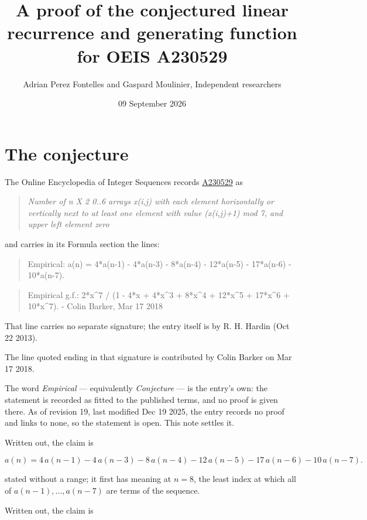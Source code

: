 \documentclass[11pt]{article}
\title{A proof of the conjectured linear recurrence and generating function for OEIS A230529}
\author{Adrian Perez Fontelles and Gaspard Moulinier, Independent researchers}
\date{09 September 2026}
\theoremstyle{definition}
\begin{document}
\maketitle
\section{The conjecture}

The Online Encyclopedia of Integer Sequences records \href{https://oeis.org/A230529}{A230529} as

\begin{quote}\itshape Number of n X 2 0..6 arrays x(i,j) with each element horizontally or vertically next to at least one element with value (x(i,j)+1) mod 7, and upper left element zero\end{quote}

and carries in its Formula section the lines:

\begin{quote}\ttfamily Empirical: a(n) = 4*a(n-1) - 4*a(n-3) - 8*a(n-4) - 12*a(n-5) - 17*a(n-6) - 10*a(n-7).\end{quote}

\begin{quote}\ttfamily Empirical g.f.: 2*x\textasciicircum{}7 / (1 - 4*x + 4*x\textasciicircum{}3 + 8*x\textasciicircum{}4 + 12*x\textasciicircum{}5 + 17*x\textasciicircum{}6 + 10*x\textasciicircum{}7). - Colin Barker, Mar 17 2018\end{quote}

That line carries no separate signature; the entry itself is by R. H. Hardin (Oct 22 2013).

The line quoted ending in that signature is contributed by Colin Barker on Mar 17 2018.

The word {\itshape Empirical} --- equivalently {\itshape Conjecture} --- is the entry's own: the statement is recorded as fitted to the published terms, and no proof is given there. As of revision 19, last modified Dec 19 2025, the entry records no proof and links to none, so the statement is open. This note settles it.

Written out, the claim is

\[a(n) = 4\,a(n-1) - 4\,a(n-3) - 8\,a(n-4) - 12\,a(n-5) - 17\,a(n-6) - 10\,a(n-7).\]

stated without a range; it first has meaning at $n = 8$, the least index at which all of $a(n-1),\dots,a(n-7)$ are terms of the sequence.

Written out, the claim is
\end{document}
